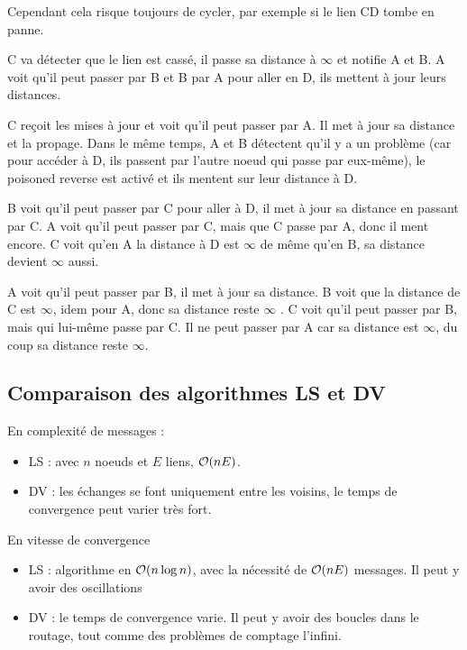 	
	Cependant cela risque toujours de cycler, par exemple si le lien CD tombe en panne.
	
	
	C va détecter que le lien est cassé, il passe sa distance à $\infty$ et notifie A et B. A voit qu'il peut passer par B et B par A pour aller en D, ils mettent à jour leurs distances.
	
	C reçoit les mises à jour et voit qu'il peut passer par A. Il met à jour sa distance et la propage. Dans le même temps, A et B détectent qu'il y a un problème (car pour accéder à D, ils passent par l'autre noeud qui passe par eux-même), le poisoned reverse est activé et ils mentent sur leur distance à D.
	
	B voit qu'il peut passer par C pour aller à D, il met à jour sa distance en passant par C. A voit qu'il peut passer par C, mais que C passe par A, donc il ment encore. C voit qu'en A la distance à D est $\infty$ de même qu'en B, sa distance devient $\infty$ aussi.
	
	A voit qu'il peut passer par B, il met à jour sa distance. B voit que la distance de C est $\infty$, idem pour A, donc sa distance reste $\infty$ . C voit qu'il peut passer par B, mais qui lui-même passe par C. Il ne peut passer par A car sa distance est $\infty$, du coup sa distance reste $\infty$.
	
	
	
	\subsection{Comparaison des algorithmes LS et DV}
	
	En complexité de messages :
	
	\begin{itemize}
		\item LS : avec $n$ noeuds et $E$ liens, $\mathcal{O}(nE)$.
		\item DV : les échanges se font uniquement entre les voisins, le temps de convergence peut varier très fort.
	\end{itemize}
	
	En vitesse de convergence
	
	\begin{itemize}
		\item LS : algorithme en $\mathcal{O}(n \log n)$, avec la nécessité de $\mathcal{O}(nE)$ messages. Il peut y avoir des oscillations
		\item DV : le temps de convergence varie. Il peut y avoir des boucles dans le routage, tout comme des problèmes de comptage  l'infini.
	\end{itemize}
	
